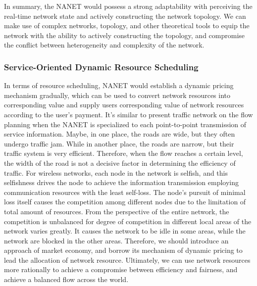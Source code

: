 \documentclass[journal,comsoc]{IEEEtran}
\begin{document}
				In summary, the NANET would possess a strong adaptability with perceiving the real-time network state and actively constructing the network topology.
				We can make use of complex networks\cite{newman2003structure}\cite{boccaletti2006complex}, topology\cite{bendsoe2001topology}, 
				and other theoretical tools to equip the network with the ability to actively constructing the topology, 
				and compromise the conflict between heterogeneity and complexity of the network.
					
			\subsubsection{Service-Oriented Dynamic Resource Scheduling}
				
				In terms of resource scheduling, NANET would establish a dynamic pricing mechanism gradually,
				which can be used to convert network resources into corresponding value and supply users corresponding value of network resources according to the user's payment.
				It's similar to present traffic network on the flow planning when the NANET is specialized to each point-to-point transmission of service information.
				Maybe, in one place, the roads are wide, but they often undergo traffic jam.
				While in another place, the roads are narrow, but their traffic system is very efficient.
				Therefore, when the flow reaches a certain level, the width of the road is not a decisive factor in determining the efficiency of traffic.
				For wireless networks, each node in the network is selfish, and this selfishness drives the node to achieve the information transmission employing communication resources with the least self-loss.
				The node's pursuit of minimal loss itself causes the competition among different nodes 	due to the limitation of total amount of resources.
				From the perspective of the entire network, the competition is unbalanced for degree of competition in different local areas of the network varies greatly. 
				It causes the network to be idle in some areas, while the network are blocked in the other areas.
				Therefore, we should introduce an approach of market economy, and borrow its mechanism of dynamic pricing to lead the allocation of network resource.
				Ultimately, we can use network resources more rationally to achieve a compromise between efficiency and fairness, and achieve a balanced flow across the world.
				
\end{document}
